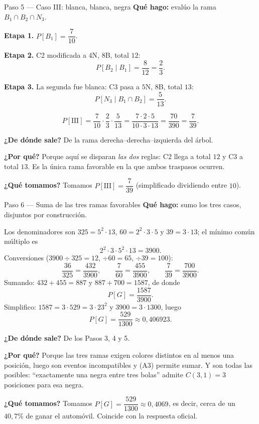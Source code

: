 \documentclass[11pt]{article}
\begin{document}
\begin{sol}
\begin{paso}{Paso 5 --- Caso III: blanca, blanca, negra}
\textbf{Qu\'e hago:} eval\'uo la rama $B_1\cap B_2\cap N_3$.

\textbf{Etapa 1.} $P[B_1]=\dfrac{7}{10}$.

\textbf{Etapa 2.} C2 modificada a $4$N, $8$B, total $12$:
\[
P[B_2\mid B_1]=\frac{8}{12}=\frac{2}{3}.
\]

\textbf{Etapa 3.} La segunda fue blanca: C3 pasa a $5$N, $8$B, total $13$:
\[
P[N_3\mid B_1\cap B_2]=\frac{5}{13}.
\]

\[
P[\text{III}]=\frac{7}{10}\cdot\frac{2}{3}\cdot\frac{5}{13}
=\frac{7\cdot 2\cdot 5}{10\cdot 3\cdot 13}=\frac{70}{390}=\frac{7}{39}.
\]

\textbf{¿De d\'onde sale?} De la rama derecha--derecha--izquierda del \'arbol.

\textbf{¿Por qu\'e?} Porque aqu\'i se disparan \emph{las dos} reglas: C2 llega a total $12$ y C3 a total $13$. Es la \'unica rama favorable en la que ambos traspasos ocurren.

\textbf{¿Qu\'e tomamos?} Tomamos $P[\text{III}]=\dfrac{7}{39}$ (simplificado dividiendo entre $10$).
\end{paso}

\begin{paso}{Paso 6 --- Suma de las tres ramas favorables}
\textbf{Qu\'e hago:} sumo los tres casos, disjuntos por construcci\'on.

Los denominadores son $325=5^{2}\cdot 13$, $60=2^{2}\cdot 3\cdot 5$ y $39=3\cdot 13$; el m\'inimo com\'un m\'ultiplo es
\[
2^{2}\cdot 3\cdot 5^{2}\cdot 13=3900 .
\]
Conversiones ($3900\div 325=12$, $\div 60=65$, $\div 39=100$):
\[
\frac{36}{325}=\frac{432}{3900},
\qquad
\frac{7}{60}=\frac{455}{3900},
\qquad
\frac{7}{39}=\frac{700}{3900}.
\]
Sumando: $432+455=887$ y $887+700=1587$, de donde
\[
P[G]=\frac{1587}{3900}.
\]
Simplifico: $1587=3\cdot 529=3\cdot 23^{2}$ y $3900=3\cdot 1300$, luego
\[
P[G]=\frac{529}{1300}\approx 0{,}406923 .
\]

\textbf{¿De d\'onde sale?} De los Pasos 3, 4 y 5.

\textbf{¿Por qu\'e?} Porque las tres ramas exigen colores distintos en al menos una posici\'on, luego son eventos incompatibles y (A3) permite sumar. Y son todas las posibles: ``exactamente una negra entre tres bolas'' admite $C(3,1)=3$ posiciones para esa negra.

\textbf{¿Qu\'e tomamos?} Tomamos $P[G]=\dfrac{529}{1300}\approx 0{,}4069$, es decir, cerca de un $40{,}7\%$ de ganar el autom\'ovil. Coincide con la respuesta oficial.
\end{paso}

\end{sol}
\end{document}
